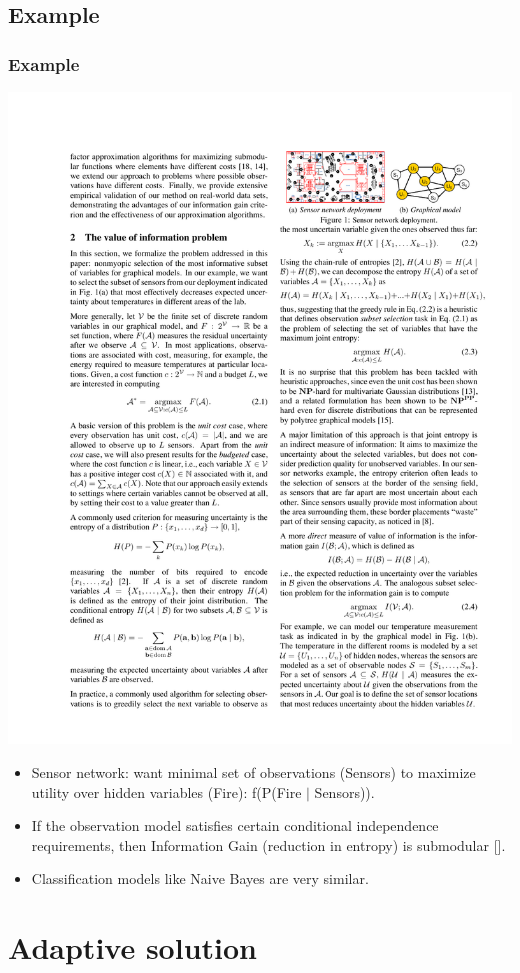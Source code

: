 \documentclass[handout]{beamer}
\begin{document}
\subsection{Example}

\begin{frame}\frametitle{Example}
\centering
\includegraphics[width=0.8\linewidth]{../figures/sensor.pdf}
\begin{itemize}
    \item Sensor network: want minimal set of observations (Sensors) to maximize utility over  hidden variables (Fire): f(P(Fire $\mid$ Sensors)).
    \pause
    \item If the observation model satisfies certain conditional independence requirements, then Information Gain (reduction in entropy) is submodular [\cite{Krause-UAI-2005}].
    \pause
    \item Classification models like Naive Bayes are very similar.
\end{itemize}
\end{frame}


\section{Adaptive solution}
\end{document}
